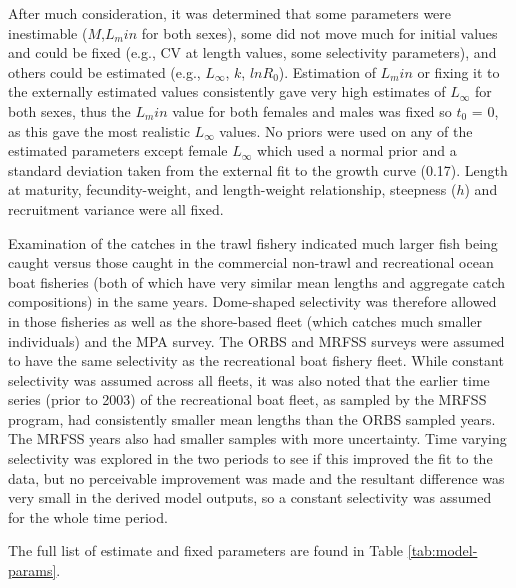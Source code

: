 \documentclass[11pt,
  english,
  letterpaper,
]{article}
\begin{document}
After much consideration, it was determined that some parameters were inestimable (\(M\),\(L_min\) for both sexes), some did not move much for initial values and could be fixed (e.g., CV at length values, some selectivity parameters), and others could be estimated (e.g., \(L_{\infty}\), \(k\), \(lnR_0\)). Estimation of \(L_min\) or fixing it to the externally estimated values consistently gave very high estimates of \(L_{\infty}\) for both sexes, thus the \(L_min\) value for both females and males was fixed so \(t_0\) = 0, as this gave the most realistic \(L_{\infty}\) values. No priors were used on any of the estimated parameters except female \(L_{\infty}\) which used a normal prior and a standard deviation taken from the external fit to the growth curve (0.17). Length at maturity, fecundity-weight, and length-weight relationship, steepness (\(h\)) and recruitment variance were all fixed.

Examination of the catches in the trawl fishery indicated much larger fish being caught versus those caught in the commercial non-trawl and recreational ocean boat fisheries (both of which have very similar mean lengths and aggregate catch compositions) in the same years. Dome-shaped selectivity was therefore allowed in those fisheries as well as the shore-based fleet (which catches much smaller individuals) and the MPA survey. The ORBS and MRFSS surveys were assumed to have the same selectivity as the recreational boat fishery fleet. While constant selectivity was assumed across all fleets, it was also noted that the earlier time series (prior to 2003) of the recreational boat fleet, as sampled by the MRFSS program, had consistently smaller mean lengths than the ORBS sampled years. The MRFSS years also had smaller samples with more uncertainty. Time varying selectivity was explored in the two periods to see if this improved the fit to the data, but no perceivable improvement was made and the resultant difference was very small in the derived model outputs, so a constant selectivity was assumed for the whole time period.

The full list of estimate and fixed parameters are found in Table \ref{tab:model-params}.
\end{document}
